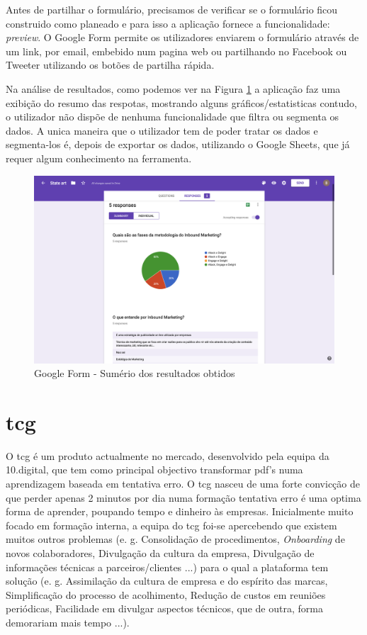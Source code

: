 Antes de partilhar o formulário, precisamos de verificar se o formulário ficou construido como planeado e para isso a aplicação fornece a funcionalidade: \textit{preview}. O Google Form permite os utilizadores enviarem o formulário através de um link, por email, embebido num pagina web ou partilhando no Facebook ou Tweeter utilizando os botões de partilha rápida.

Na análise de resultados, como podemos ver na Figura \ref{fig:gf-form-results} a aplicação faz uma exibição do resumo das respotas, mostrando alguns gráficos/estatisticas contudo, o utilizador não dispõe de nenhuma funcionalidade que filtra ou segmenta os dados. A unica maneira que o utilizador tem de poder tratar os dados e segmenta-los é, depois de exportar os dados, utilizando o Google Sheets, que já requer algum conhecimento na ferramenta. 


\begin{figure}[ht!]
	\begin{center}
		\includegraphics[width=1\textwidth]{img/gf/gf-form-results}
		\caption{Google Form - Sumério dos resultados obtidos}
		\label{fig:gf-form-results}
	\end{center}
\end{figure}

\section{\acrfull{tcg}}
\label{sec:TCG}

O \acrlong{tcg} é um produto actualmente no mercado, desenvolvido pela equipa da 10.digital, que tem como principal objectivo transformar pdf's numa aprendizagem baseada em tentativa erro. O \acrshort{tcg} nasceu de uma forte convicção de que perder apenas 2 minutos por dia numa formação tentativa erro é uma optima forma de aprender, poupando tempo e dinheiro às empresas. Inicialmente muito focado em formação interna, a equipa do \acrshort{tcg} foi-se apercebendo que existem muitos outros problemas (e. g. Consolidação de procedimentos, \textit{Onboarding} de novos colaboradores, Divulgação da cultura da empresa, Divulgação de informações técnicas a parceiros/clientes ...) para o qual a plataforma tem solução (e. g. Assimilação da cultura de empresa e do espírito das marcas, Simplificação do processo de acolhimento, Redução de custos em reuniões periódicas, Facilidade em divulgar aspectos técnicos, que de outra, forma demorariam mais tempo ...).\cite{tcginfo}

